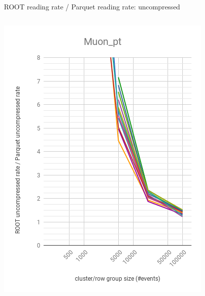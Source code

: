 \documentclass[aspectratio=169]{beamer}
\begin{document}
\begin{frame}{ROOT reading rate / Parquet reading rate: uncompressed}
\vspace{-0.15 cm}

\begin{columns}
\begin{center}
\includegraphics[width=\linewidth]{root-none-parquet-none-Muon_pt.png}
\end{center}
\begin{center}

\end{center}
\end{columns}
\end{frame}
\end{document}
